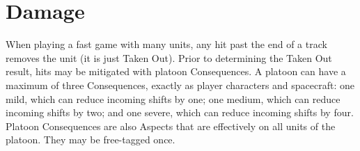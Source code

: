 \section{Damage}\label{sec:platoon-combat-damage}

When playing a fast game with many units, any hit past the end of a track removes the unit (it is just Taken Out). Prior to determining the Taken Out result, hits may be mitigated with platoon Consequences. A platoon can have a maximum of three Consequences, exactly as player characters and spacecraft: one mild, which can reduce incoming shifts by one; one medium, which can reduce incoming shifts by two; and one severe, which can reduce incoming shifts by four. Platoon Consequences are also Aspects that are effectively on all units of the platoon. They may be free-tagged once.

